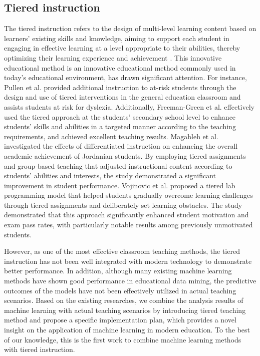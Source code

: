 \subsection{Tiered instruction}
The tiered instruction \cite{richards2007effects} refers to the design of multi-level learning content based on learners' existing skills and knowledge, aiming to support each student in engaging in effective learning at a level appropriate to their abilities, thereby optimizing their learning experience and achievement \cite{nichols2020teacher}. This innovative educational method is an innovative educational method commonly used in today's educational environment, has drawn significant attention. For instance, Pullen et al. \cite{pullen2010tiered} provided additional instruction to at-risk students through the design and use of tiered interventions in the general education classroom and assists students at risk for dyslexia. Additionally, Freeman-Green et al. \cite{freeman2018mathematics} effectively used the tiered approach at the students' secondary school level to enhance students' skills and abilities in a targeted manner according to the teaching requirements, and achieved excellent teaching results. Magableh et al. \cite{magableh2020effectiveness} investigated the effects of differentiated instruction on enhancing the overall academic achievement of Jordanian students. By employing tiered assignments and group-based teaching that adjusted instructional content according to students' abilities and interests, the study demonstrated a significant improvement in student performance. Vojinovic et al. \cite{vojinovic2020tiered} proposed a tiered lab programming model that helped students gradually overcome learning challenges through tiered assignments and deliberately set learning obstacles. The study demonstrated that this approach significantly enhanced student motivation and exam pass rates, with particularly notable results among previously unmotivated students. 

However, as one of the most effective classroom teaching methods, the tiered instruction has not been well integrated with modern technology to demonstrate better performance. In addition, although many existing machine learning methods have shown good performance in educational data mining, the predictive outcomes of the models have not been effectively utilized in actual teaching scenarios. Based on the existing researches, we combine the analysis results of machine learning with actual teaching scenarios by introducing tiered teaching method and propose a specific implementation plan, which provides a novel insight on the application of machine learning in modern education. To the best of our knowledge, this is the first work to combine machine learning methods with tiered instruction.